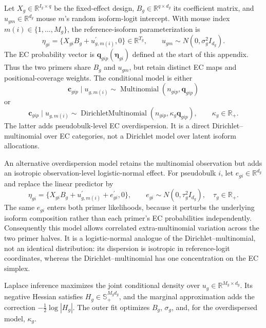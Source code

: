 \documentclass[11pt]{article}
\begin{document}
Let \(X_g\in\mathbb R^{I_g\times q}\) be the fixed-effect design, \(B_g\in\mathbb R^{q\times d_g}\) its coefficient matrix, and \(u_{gm}\in\mathbb R^{d_g}\) mouse \(m\)'s random isoform-logit intercept. With mouse index \(m(i)\in\{1,\ldots,M_g\}\), the reference-isoform parameterization is \[
 \eta_{gi}=\{X_{gi}B_g+u_{g,m(i)}^\prime,0\}
 \in\mathbb R^{T_g},
 \qquad
 u_{gm}\sim N(0,\sigma_g^2I_{d_g}).
\]
The EC probability vector is \(\bm q_{gip}(\bm\eta_{gi})\) defined at the start of this appendix. Thus the two primers share \(B_g\) and \(u_{gm}\), but retain distinct EC maps and positional-coverage weights. The conditional model is either \[
 \bm c_{gip}\mid u_{g,m(i)}
 \sim\operatorname{Multinomial}(n_{gip},\bm q_{gip})
\]
or \[
 \bm c_{gip}\mid u_{g,m(i)}
 \sim\operatorname{DirichletMultinomial}
 (n_{gip},\kappa_g\bm q_{gip}),
 \qquad \kappa_g\in\mathbb R_+.
\]
The latter adds pseudobulk-level EC overdispersion. It is a direct Dirichlet--multinomial over EC categories, not a Dirichlet model over latent isoform allocations.

An alternative overdispersion model retains the multinomial observation but adds an isotropic observation-level logistic-normal effect. For pseudobulk $i$, let $e_{gi}\in\mathbb R^{d_g}$ and replace the linear predictor by \[
 \eta_{gi}=\{X_{gi}B_g+u_{g,m(i)}^\prime+e_{gi}^\prime,0\},
 \qquad e_{gi}\sim N(0,\tau_g^2I_{d_g}),
 \quad \tau_g\in\mathbb R_+.
\]
The same $e_{gi}$ enters both primer likelihoods, because it perturbs the underlying isoform composition rather than each primer's EC probabilities independently. Consequently this model allows correlated extra-multinomial variation across the two primer halves. It is a logistic-normal analogue of the Dirichlet--multinomial, not an identical distribution: its dispersion is isotropic in reference-logit coordinates, whereas the Dirichlet--multinomial has one concentration on the EC simplex.

Laplace inference maximizes the joint conditional density over \(u_g\in\mathbb R^{M_g\times d_g}\). Its negative Hessian satisfies \(H_g\in\mathbb S_+^{M_gd_g}\), and the marginal approximation adds the correction \(-\tfrac12\log|H_g|\). The outer fit optimizes \(B_g\), \(\sigma_g\), and, for the overdispersed model, \(\kappa_g\).
\end{document}
